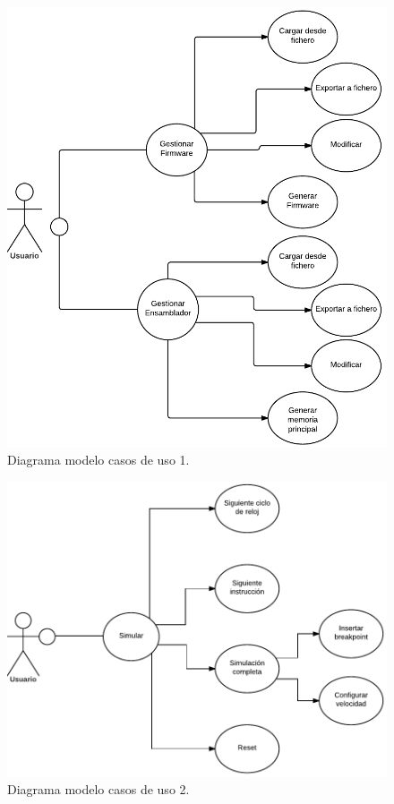 \begin{figure}[htbp]
 	\centering
 	\includegraphics[width=14cm]{figures/user_cases_1}
 	\caption{Diagrama modelo casos de uso 1.}
	\label{fig:user_cases1}
\end{figure}

\vspace{20 mm}

\begin{figure}[htbp]
 	\centering
 	\includegraphics[width=15cm]{figures/user_cases_2}
 	\caption{Diagrama modelo casos de uso 2.}
	\label{fig:user_cases2}
\end{figure}

